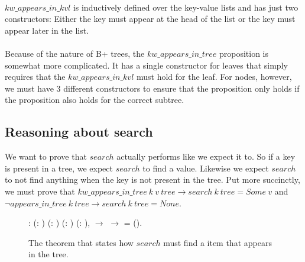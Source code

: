\paragraph{}
$kw\_appears\_in\_kvl$ is inductively defined over the key-value lists and has just two constructors: Either the key must appear at the head of the list or the key must appear later in the list.

\paragraph{}
Because of the nature of B+ trees, the $kw\_appears\_in\_tree$ proposition is somewhat more complicated. It has a single constructor for leaves that simply requires that the $kw\_appears\_in\_kvl$ must hold for the leaf. For nodes, however, we must have 3 different constructors to ensure that the proposition only holds if the proposition also holds for the correct subtree.

\subsection{Reasoning about search}
We want to prove that $search$ actually performs like we expect it to. So if a key is present in a tree, we expect $search$ to find a value. Likewise we expect $search$ to not find anything when the key is not present in the tree.
Put more succinctly, we must prove that $kw\_appears\_in\_tree~k~v~tree \rightarrow search~k~tree = Some~v$ and $\lnot appears\_in\_tree~k~tree \rightarrow search~k~tree = None$.

\begin{figure}
  \begin{coqdoccode}
  \coqdocnoindent
    : \coqdockw{\ensuremath{\forall}} (: ) (: ) (:   ) (: ),\coqdoceol
  \coqdocindent{1.00em}
      \ensuremath{\rightarrow} \coqdoceol
  \coqdocindent{1.00em}
      \ensuremath{\rightarrow} \coqdoceol
  \coqdocindent{1.00em}
    = ().\coqdoceol
  \end{coqdoccode}
  \caption{The theorem that states how $search$ must find a item that appears in the tree.}
  \label{fig:search_works}
\end{figure}

